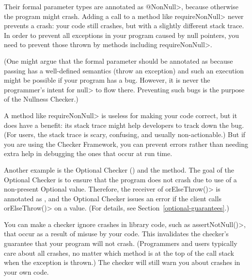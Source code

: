 Their formal parameter types are annotated as \<@NonNull>, because otherwise the
program might crash.  Adding a call to a method like \<requireNonNull>
never prevents a crash:  your code still crashes, but with a slightly
different stack trace.  In order to prevent all exceptions in your program
caused by null pointers, you need to prevent those thrown by methods including
\<requireNonNull>.

(One might argue that the formal parameter should be annotated as
 because passing  has a
well-defined semantics (throw an exception) and such an execution might be
possible if your program has a bug.  However, it is never the programmer's
intent for \<null> to flow there.  Preventing such bugs is the purpose of
the Nullness Checker.)

A method like \<requireNonNull> is useless for making your code correct,
but it does have a benefit:  its stack trace might help developers to track
down the bug.  (For users, the stack trace is scary, confusing, and usually
non-actionable.)  But if you are using the Checker Framework, you can
prevent errors rather than needing extra help in debugging the ones that
occur at run time.


Another example is the Optional Checker ()
and the  method.
The goal of the Optional Checker is to ensure that the program does not
crash due to use of a non-present Optional value.  Therefore, the receiver
of
\<orElseThrow()> is annotated as
,
and the Optional Checker issues an error if the client calls
\<orElseThrow()> on a  value.
(For details, see Section~\ref{optional-guarantees}.)


You can make a checker ignore crashes in library code, such as
\<assertNotNull()>, that occur as a result of misuse by your code.
This invalidates the checker's guarantee that your program will not crash.
(Programmers and users typically care about all crashes, no matter which
method is at the top of the call stack when the exception is thrown.)
The checker will still warn you about crashes in your own code.

